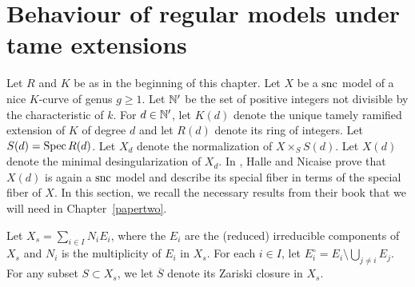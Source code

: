 \section{Behaviour of regular models under tame extensions}\label{deftameext}
Let $R$ and $K$ be as in the beginning of this chapter. Let $X$ be a $\textup{snc}$ model of a nice $K$-curve of genus $g \geq 1$. Let $\mathbb N'$ be the set of positive integers not divisible by the characteristic of $k$. For $d \in \mathbb N'$, let $K(d)$ denote the unique tamely ramified extension of $K$ of degree $d$ and let $R(d)$ denote its ring of integers. Let $S(d) = \operatorname{Spec} R(d)$. Let $X_d$ denote the normalization of $X \times_S S(d)$. Let $X(d)$ denote the minimal desingularization of $X_d$. In \cite[Chapter 3]{halnic}, Halle and Nicaise prove that $X(d)$ is again a $\textup{snc}$ model and describe its special fiber in terms of the special fiber of $X$. In this section, we recall the necessary results from their book that we will need in Chapter~\ref{papertwo}. 

Let $X_s = \sum_{i \in I} N_i E_i$, where the $E_i$ are the (reduced) irreducible components of $X_s$ and $N_i$ is the multiplicity of $E_i$ in $X_s$. For each $i \in I$, let $E_i^\circ = E_i \setminus \bigcup_{j \neq i} E_j$. For any subset $S \subset X_s$, we let $\overline{S}$ denote its Zariski closure in $X_s$.

